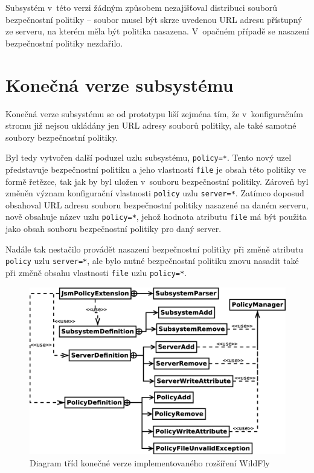 Subsystém v~této verzi žádným způsobem nezajišťoval distribuci souborů bezpečnostní politiky -- soubor musel být skrze uvedenou URL adresu přístupný ze serveru, na kterém měla být politika nasazena. V~opačném případě se nasazení bezpečnostní politiky nezdařilo.

\section{Konečná verze subsystému}

Konečná verze subsystému se od prototypu liší zejména tím, že v~konfiguračním stromu již nejsou ukládány jen URL adresy souborů politiky, ale také samotné soubory bezpečnostní politiky.

Byl tedy vytvořen další poduzel uzlu subsystému, {\tt policy=*}. Tento nový uzel představuje bezpečnostní politiku a jeho vlastností {\tt file} je obsah této politiky ve formě řetězce, tak jak by byl uložen v~souboru bezpečnostní politiky.
Zároveň byl změněn význam konfigurační vlastnosti {\tt policy} uzlu {\tt server=*}. Zatímco doposud obsahoval URL adresu souboru bezpečnostní politiky nasazené na daném serveru, nově obsahuje název uzlu {\tt policy=*}, jehož hodnota atributu {\tt file} má být použita jako obsah souboru bezpečnostní politiky pro daný server.

Nadále tak nestačilo provádět nasazení bezpečnostní politiky při změně atributu {\tt policy} uzlu {\tt server=*}, ale bylo nutné bezpečnostní politiku znovu nasadit také při změně obsahu vlastnosti {\tt file} uzlu {\tt policy=*}.

\begin{figure}[t]
  \centering
  \includegraphics[width=12cm]{fig/tridy2}
  \caption{Diagram tříd konečné verze implementovaného rozšíření WildFly}
  \label{tridy2}
\end{figure}

